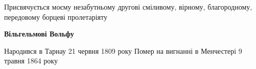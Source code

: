 \thispagestyle{empty}
\null\vspace{6cm}

\noindent\hspace{1.5cm}
\begin{minipage}{\linewidth-1.5cm}
\scmain 
\raggedright
Присвячується моєму незабутньому другові\newline
сміливому, вірному, благородному,\newline
передовому борцеві пролетаріяту

\smallskip
{\Large\bfseries\scsans Вільгельмові Вольфу}

\smallskip
Народився в Тарнау 21 червня 1809 року\newline
Помер на вигнанні в Менчестері 9 травня 1864 року
\end{minipage}

\cleardoublepage